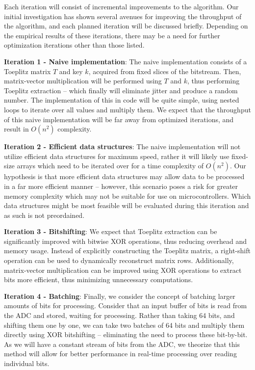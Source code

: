 Each iteration will consist of incremental improvements to the algorithm. Our initial investigation has shown several avenues for improving the throughput of the algorithm, and each planned iteration will be discussed briefly. Depending on the empirical results of these iterations, there may be a need for further optimization iterations other than those listed.

\textbf{Iteration 1 - Naive implementation}: The naive implementation consists of a Toeplitz matrix \(T\) and key \(k\), acquired from fixed slices of the bitstream. Then, matrix-vector multiplication will be performed using \(T\) and \(k\), thus performing Toeplitz extraction -- which finally will eliminate jitter and produce a random number. The implementation of this in code will be quite simple, using nested loops to iterate over all values and multiply them. We expect that the throughput of this naive implementation will be far away from optimized iterations, and result in \(O(n^2)\) complexity.

\textbf{Iteration 2 - Efficient data structures}: The naive implementation will not utilize efficient data structures for maximum speed, rather it will likely use fixed-size arrays which need to be iterated over for a time complexity of \(O(n^2)\). Our hypothesis is that more efficient data structures may allow data to be processed in a far more efficient manner -- however, this scenario poses a risk for greater memory complexity which may not be suitable for use on microcontrollers. Which data structures might be most feasible will be evaluated during this iteration and as such is not preordained.

\textbf{Iteration 3 - Bitshifting}: We expect that Toeplitz extraction can be significantly improved with bitwise XOR operations, thus reducing overhead and memory usage. Instead of explicitly constructing the Toeplitz matrix, a right-shift operation can be used to dynamically reconstruct matrix rows. Additionally, matrix-vector multiplication can be improved using XOR operations to extract bits more efficient, thus minimizing unnecessary computations.

\textbf{Iteration 4 - Batching}: Finally, we consider the concept of batching larger amounts of bits for processing. Consider that an input buffer of bits is read from the ADC and stored, waiting for processing. Rather than taking 64 bits, and shifting them one by one, we can take two batches of 64 bits and multiply them directly using XOR bitshifting -- eliminating the need to process these bit-by-bit. As we will have a constant stream of bits from the ADC, we theorize that this method will allow for better performance in real-time processing over reading individual bits.

